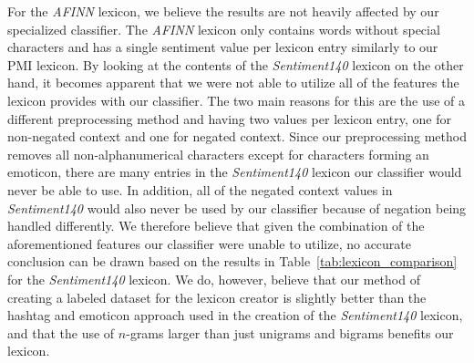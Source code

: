 For the \textit{AFINN} lexicon, we believe the results are not heavily affected by our specialized classifier. The \textit{AFINN} lexicon only contains words without special characters and has a single sentiment value per lexicon entry similarly to our PMI lexicon. By looking at the contents of the \textit{Sentiment140} lexicon on the other hand, it becomes apparent that we were not able to utilize all of the features the lexicon provides with our classifier. The two main reasons for this are the use of a different preprocessing method and having two values per lexicon entry, one for non-negated context and one for negated context. Since our preprocessing method removes all non-alphanumerical characters except for characters forming an emoticon, there are many entries in the \textit{Sentiment140} lexicon our classifier would never be able to use. In addition, all of the negated context values in \textit{Sentiment140} would also never be used by our classifier because of negation being handled differently. We therefore believe that given the combination of the aforementioned features our classifier were unable to utilize, no accurate conclusion can be drawn based on the results in Table~\ref{tab:lexicon_comparison} for the \textit{Sentiment140} lexicon. We do, however, believe that our method of creating a labeled dataset for the lexicon creator is slightly better than the hashtag and emoticon approach used in the creation of the \textit{Sentiment140} lexicon, and that the use of $n$-grams larger than just unigrams and bigrams benefits our lexicon. \\

